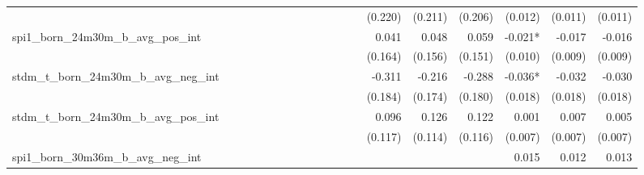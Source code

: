 \begin{tabular}{lrrrrrrrrrrrrrrrrrr}
                                            &              &              &              &              &              &              &              &              &               &              &              &               &      (0.220) &      (0.211) &       (0.206) &      (0.012) &      (0.011) &       (0.011) \\ 
spi1\_born\_24m30m\_b\_avg\_pos\_int        &              &              &              &              &              &              &              &              &               &              &              &               &        0.041 &        0.048 &         0.059 &      -0.021* &       -0.017 &        -0.016 \\ 
                                            &              &              &              &              &              &              &              &              &               &              &              &               &      (0.164) &      (0.156) &       (0.151) &      (0.010) &      (0.009) &       (0.009) \\ 
stdm\_t\_born\_24m30m\_b\_avg\_neg\_int     &              &              &              &              &              &              &              &              &               &              &              &               &       -0.311 &       -0.216 &        -0.288 &      -0.036* &       -0.032 &        -0.030 \\ 
                                            &              &              &              &              &              &              &              &              &               &              &              &               &      (0.184) &      (0.174) &       (0.180) &      (0.018) &      (0.018) &       (0.018) \\ 
stdm\_t\_born\_24m30m\_b\_avg\_pos\_int     &              &              &              &              &              &              &              &              &               &              &              &               &        0.096 &        0.126 &         0.122 &        0.001 &        0.007 &         0.005 \\ 
                                            &              &              &              &              &              &              &              &              &               &              &              &               &      (0.117) &      (0.114) &       (0.116) &      (0.007) &      (0.007) &       (0.007) \\ 
spi1\_born\_30m36m\_b\_avg\_neg\_int        &              &              &              &              &              &              &              &              &               &              &              &               &              &              &               &        0.015 &        0.012 &         0.013 \\ 

\end{tabular}
